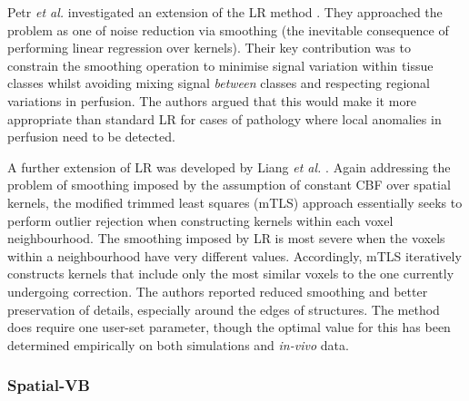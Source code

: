 Petr \textit{et al.} investigated an extension of the LR method \cite{Petr2010}. They approached the problem as one of noise reduction via smoothing (the inevitable consequence of performing linear regression over kernels). Their key contribution was to constrain the smoothing operation to minimise signal variation within tissue classes whilst avoiding mixing signal \textit{between} classes and respecting regional variations in perfusion. The authors argued that this would make it more appropriate than standard LR for cases of pathology where local anomalies in perfusion need to be detected. 

A further extension of LR was developed by Liang \textit{et al.} \cite{Liang2013}. Again addressing the problem of smoothing imposed by the assumption of constant CBF over spatial kernels, the modified trimmed least squares (mTLS) approach essentially seeks to perform outlier rejection when constructing kernels within each voxel neighbourhood. The smoothing imposed by LR is most severe when the voxels within a neighbourhood have very different values. Accordingly, mTLS iteratively constructs kernels that include only the most similar voxels to the one currently undergoing correction. The authors reported reduced smoothing and better preservation of details, especially around the edges of structures. The method does require one user-set parameter, though the optimal value for this has been determined empirically on both simulations and \textit{in-vivo} data. 

\subsubsection{Spatial-VB}
\label{fabber_pvec}

